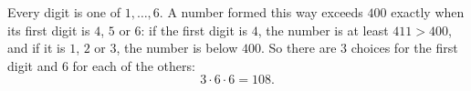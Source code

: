 Every digit is one of $1,\dots,6$. A number formed this way exceeds $400$ exactly when its first digit is $4$, $5$ or $6$: if the first digit is $4$, the number is at least $411>400$, and if it is $1$, $2$ or $3$, the number is below $400$. So there are $3$ choices for the first digit and $6$ for each of the others:
\[
3\cdot6\cdot6=\boxed{108}.
\]
